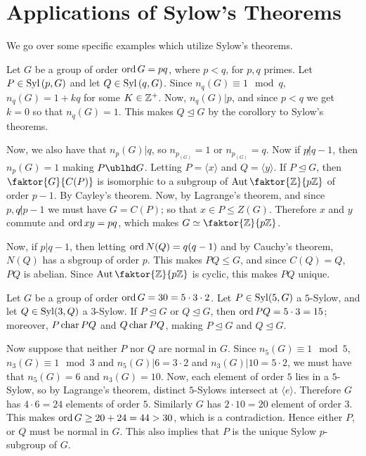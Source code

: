 \section{Applications of Sylow's Theorems}

We go over some specific examples which utilize Sylow's theorems.

\begin{example}\label{4.13}
    Let $G$ be a group of order $\operatorname{ord}{G}=pq$, where $p<q$, for  $p,q$ primes.
    Let  $P \in \operatorname{Syl}{(p,G)}$ and let $Q \in \operatorname{Syl}{(q,G)}$. Since $n_q(G) \equiv 1
    \mod{q}$, $n_q(G)=1+kq$ for some $K \in \mathbb{Z}^+$. Now,  $n_q(G)|p$, and since
    $p<q$ we get  $k=0$ so that  $n_q(G)=1$. This makes $Q \unlhd G$ by the
    corollory to Sylow's theorems.

    Now, we also have that  $n_p(G)|q$, so $n_p_(G)=1$ or $n_p_(G)=q$. Now if $p
    \not| q-1$, then  $n_p(G)=1$ making $P \ublhd G$. Letting  $P=\langle x
    \rangle$ and $Q=\langle y \rangle$. If $P \unlhd G$, then
    $\faktor{G}{C(P)}$ is isomorphic to a subgroup of $\Aut{\faktor{\Z}{p\Z}}$
    of order $p-1$. By Cayley's theorem. Now, by Lagrange's theorem, and since
    $p,q \not| p-1$ we must have  $G=C(P)$; so that $x \in P \leq Z(G)$.
    Therefore $x$ and $y$ commute and  $\operatorname{ord}{xy}=pq$, which makes $G \simeq
    \faktor{\Z}{p\Z}$.

    Now, if $p|q-1$, then letting $\operatorname{ord}{N(Q)}=q(q-1)$ and by Cauchy's theorem,
    $N(Q)$ has a sbgroup of order $p$. This makes $PQ \leq G$, and since
    $C(Q)=Q$, $PQ$ is abelian. Since  $\Aut{\faktor{\Z}{p\Z}}$ is cyclic, this
    makes $PQ$ unique.
\end{example}

\begin{example}\label{4.14}
    Let $G$ be a group of order  $\operatorname{ord}{G}=30=5 \cdot 3 \cdot 2$. Let $P \in
    \operatorname{Syl}(5,G)$ a $5$-Sylow, and let  $Q \in \operatorname{Syl}(3,Q)$ a $3$-Sylow. If  $P
    \unlhd G$ or  $Q \unlhd G$, then  $\operatorname{ord}{PQ}=5 \cdot 3=15$; moreover, $P
    \operatorname{char}{PQ}$ and $Q \operatorname{char}{PQ}$, making $P \unlhd G$ and  $Q \unlhd G$.

    Now suppose that neither $P$ nor $Q$ are normal in $G$. Since $n_5(G) \equiv
    1 \mod{5}$, $n_3(G) \equiv 1 \mod{3}$ and $n_5(G)|6=3 \cdot 2$ and
    $n_3(G)|10=5 \cdot 2$, we must have that $n_5(G)=6$ and $n_3(G)=10$. Now,
    each element of order $5$ lies in a $5$-Sylow, so by Lagrange's theorem,
    distinct $5$-Sylows intersect at  $\langle e \rangle$. Therefore $G$ has $4
    \cdot 6=24$ elements of order $5$. Similarly $G$ has $2 \cdot 10=20$ element
    of order $3$. This makes $\operatorname{ord}{G} \geq 20+24=44>30$, which is a contradiction.
    Hence either $P$, or  $Q$ must be normal in $G$. This also implies that $P$
    is the unique Sylow $p$-subgroup of $G$.
\end{example}


